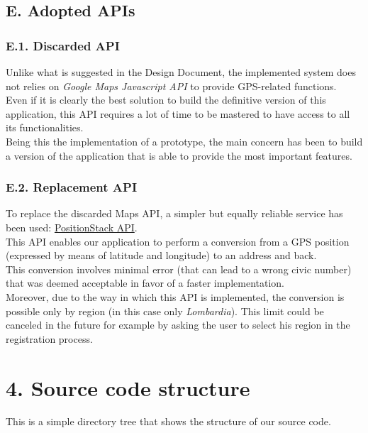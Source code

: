 \section{E. Adopted APIs}

\subsection{E.1. Discarded API}

Unlike what is suggested in the Design Document, the implemented system does not relies on \emph{Google Maps Javascript API} to provide GPS-related functions.\\
Even if it is clearly the best solution to build the definitive version of this application, this API requires a lot of time to be mastered to have access to all its functionalities.\\
Being this the implementation of a prototype, the main concern has been to build a version of the application that is able to provide the most important features.

\subsection{E.2. Replacement API}

To replace the discarded Maps API, a simpler but equally reliable service has been used: \href{https://positionstack.com/documentation}{PositionStack API}.\\
This API enables our application to perform a conversion from a GPS position (expressed by means of latitude and longitude) to an address and back.\\
This conversion involves minimal error (that can lead to a wrong civic number) that was deemed acceptable in favor of a faster implementation.\\
Moreover, due to the way in which this API is implemented, the conversion is possible only by region (in this case only \emph{Lombardia}). This limit could be canceled in the future for example by asking the user to select his region in the registration process.

\chapter{4. Source code structure}

This is a simple directory tree that shows the structure of our source code.

